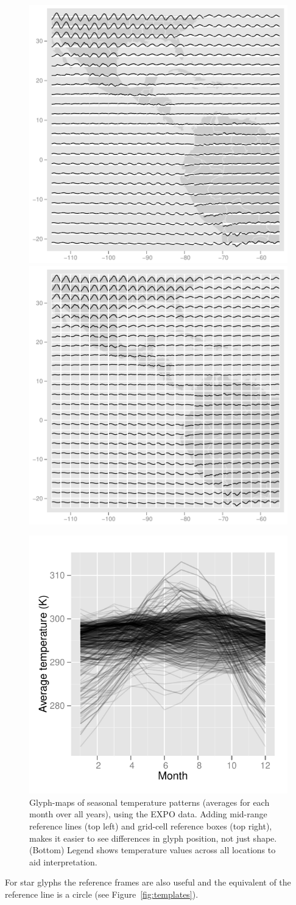 \documentclass[oneside]{article}
\begin{document}
\begin{figure}[htbp]
  \centering
  \includegraphics[width=0.5\linewidth]{ref-line}%
  \includegraphics[width=0.5\linewidth]{ref-box}

  \includegraphics[width=0.33\linewidth]{ref-legend}

  \caption{Glyph-maps of seasonal temperature patterns (averages for each month over all years), using the EXPO data. Adding mid-range reference lines (top left) and grid-cell reference boxes (top right), makes it easier to see differences in glyph position, not just shape. (Bottom) Legend shows temperature values across all locations to aid interpretation.}
  \label{fig:ref-basic}
\end{figure}

For star glyphs the reference frames are also useful and the equivalent of the reference line is a circle (see Figure~\ref{fig:templates}).
\end{document}
